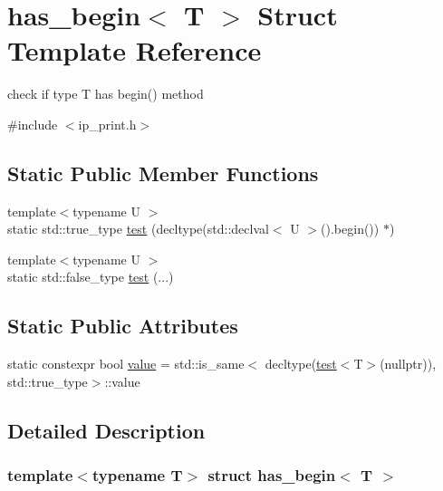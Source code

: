 \hypertarget{structhas__begin}{}\section{has\+\_\+begin$<$ T $>$ Struct Template Reference}
\label{structhas__begin}


check if type T has \textquotesingle{}begin()\textquotesingle{} method  




{\ttfamily \#include $<$ip\+\_\+print.\+h$>$}

\subsection*{Static Public Member Functions}
\begin{DoxyCompactItemize}
\item 
{\footnotesize template$<$typename U $>$ }\\static std\+::true\+\_\+type \hyperlink{structhas__begin_a9483204ce6d4d3de89ccd58f14e73cac}{test} (decltype(std\+::declval$<$ U $>$().begin()) $\ast$)
\item 
{\footnotesize template$<$typename U $>$ }\\static std\+::false\+\_\+type \hyperlink{structhas__begin_a47c984fb137d9cbe3db134c6a5a22550}{test} (...)
\end{DoxyCompactItemize}
\subsection*{Static Public Attributes}
\begin{DoxyCompactItemize}
\item 
static constexpr bool \hyperlink{structhas__begin_ae9ecdd6dfb43b08a7a028c5e8794359a}{value} = std\+::is\+\_\+same$<$ decltype(\hyperlink{structhas__begin_a9483204ce6d4d3de89ccd58f14e73cac}{test}$<$T$>$(nullptr)), std\+::true\+\_\+type$>$\+::value
\end{DoxyCompactItemize}


\subsection{Detailed Description}
\subsubsection*{template$<$typename T$>$\newline
struct has\+\_\+begin$<$ T $>$}


